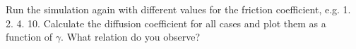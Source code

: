 Run the simulation again with different values for the friction
coefficient, e.g. 1. 2. 4. 10. Calculate the diffusion
coefficient for all cases and plot them as a function of $\gamma$. What relation
do you observe?



